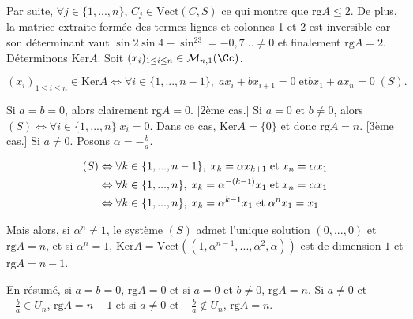{{Par suite, $\forall j\in\{1,...,n\}$, $C_j\in\mbox{Vect}(C,S)$ ce qui montre que $\mbox{rg}A\leq2$. De plus, la matrice extraite formée des termes lignes et colonnes 1 et 2 est inversible car son déterminant vaut
$\sin2\sin4-\sin^23=-0,7...\neq0$ et finalement $\mbox{rg}A=2$.
Déterminons $\mbox{Ker}A$. Soit $(x_i)_{1\leq i\leq n}\in\mathcal{M}_{n,1}(\Cc)$.

$$(x_i)_{1\leq i\leq n}\in\mbox{Ker}A\Leftrightarrow\forall i\in\{1,...,n-1\},\;ax_i+bx_{i+1}=0\;\mbox{et}bx_1+ax_n=0\;(S).$$

\begin{itemize}
[1er cas.] Si $a=b=0$, alors clairement $\mbox{rg}A=0$.
[2ème cas.] Si $a=0$ et $b\neq0$, alors $(S)\Leftrightarrow\forall i\in\{1,...,n\}\;x_i=0$. Dans ce cas, $\mbox{Ker}A=\{0\}$ et donc $\mbox{rg}A=n$.
[3ème cas.] Si $a\neq0$. Posons $\alpha=-\frac{b}{a}$.

\begin{align*}\ensuremath
(S)&\Leftrightarrow\forall k\in\{1,...,n-1\},\;x_k=\alpha x_{k+1}\;\mbox{et}\;x_n=\alpha x_1\\
 &\Leftrightarrow\forall k\in\{1,...,n\},\;x_k=\alpha^{-(k-1)}x_1\;\mbox{et}\;x_n=\alpha x_1\\
 &\Leftrightarrow\forall k\in\{1,...,n\},\;x_k=\alpha^{k-1}x_1\;\mbox{et}\;\alpha^n x_1=x_1
\end{align*}

Mais alors, si $\alpha^n\neq1$, le système $(S)$ admet l'unique solution $(0,...,0)$ et $\mbox{rg}A=n$, et si $\alpha^n=1$, $\mbox{Ker}A=\mbox{Vect}((1,\alpha^{n-1},...,\alpha^2,\alpha))$ est de dimension $1$ et $\mbox{rg}A=n-1$.
\end{itemize}

En résumé, si $a=b=0$, $\mbox{rg}A=0$ et si $a=0$ et $b\neq0$, $\mbox{rg}A=n$. Si $a\neq0$ et $-\frac{b}{a}\in U_n$, $\mbox{rg}A=n-1$ et si $a\neq0$ et $-\frac{b}{a}\notin U_n$, $\mbox{rg}A=n$.
}
}
